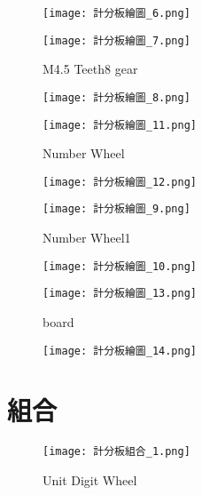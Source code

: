 \begin{figure}[hbt!]
  \centering
  \texttt{[image: 計分板繪圖\_6.png]}
\end{figure}

\begin{figure}[hbt!]
  \centering
  \texttt{[image: 計分板繪圖\_7.png]}
  \caption{M4.5 Teeth8 gear}
  \label{fig:photo6}
\end{figure}

\begin{figure}[hbt!]
  \centering
  \texttt{[image: 計分板繪圖\_8.png]}
\end{figure}

\begin{figure}[hbt!]
  \centering
  \texttt{[image: 計分板繪圖\_11.png]}
  \caption{Number Wheel}
  \label{fig:photo7}
\end{figure}

\begin{figure}[hbt!]
  \centering
  \texttt{[image: 計分板繪圖\_12.png]}
\end{figure}

\begin{figure}[hbt!]
  \centering
  \texttt{[image: 計分板繪圖\_9.png]}
  \caption{Number Wheel1}
  \label{fig:photo8}
\end{figure}

\begin{figure}[hbt!]
  \centering
  \texttt{[image: 計分板繪圖\_10.png]}
\end{figure}

\begin{figure}[hbt!]
  \centering
  \texttt{[image: 計分板繪圖\_13.png]}
  \caption{board}
  \label{fig:photo9}
\end{figure}

\begin{figure}[hbt!]
  \centering
  \texttt{[image: 計分板繪圖\_14.png]}
\end{figure}
\newpage

\section{組合}
\begin{figure}[hbt!]
  \centering
  \texttt{[image: 計分板組合\_1.png]}
  \caption{Unit Digit Wheel}
  \label{fig:photo10}
\end{figure}

